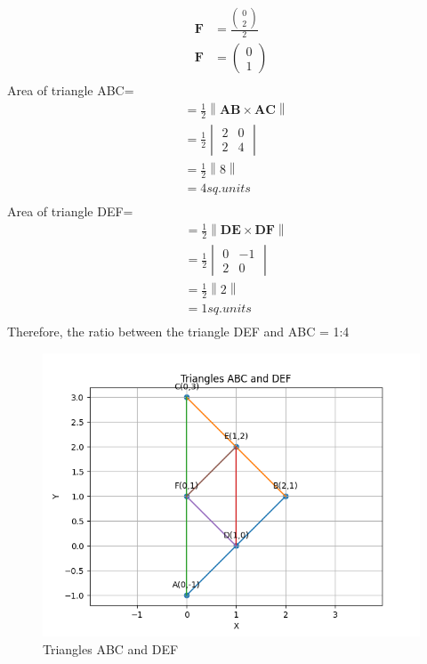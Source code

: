 \documentclass{article}
\newcommand{\myvec}[1]{\ensuremath{\begin{pmatrix}#1\end{pmatrix}}}
\newcommand{\mydet}[1]{\ensuremath{\begin{vmatrix}#1\end{vmatrix}}}
\providecommand{\norm}[1]{\left\lVert#1\right\rVert}
\let\vec\mathbf
\begin{document}
\begin{enumerate}
\begin{align}
    \vec{F} &= \frac{\myvec{0\\2}}{2}\\
    \vec{F} &= \myvec{0\\1}\\
\end{align}
Area of triangle ABC=
 \begin{align}
 &=\frac{1}{2}\norm{\vec{AB}\times\vec{AC}}\\
  &=\frac{1}{2}\mydet{2&0\\2&4}\\
   &=\frac{1}{2}\norm{8}\\
    &=4 sq.units\\
\end{align}
Area of triangle DEF= 
 \begin{align}
 &=\frac{1}{2}\norm{\vec{DE}\times\vec{DF}}\\
  &=\frac{1}{2}\mydet{0&-1\\2&0}\\
   &=\frac{1}{2}\norm{2}\\
    &=1 sq.units\\
 \end{align}
 Therefore, the ratio between the triangle DEF and ABC = 1:4
\end{enumerate}
\begin{figure}[H]
			\centering
			\includegraphics[width=\columnwidth]{figs/Figure_1.png}
			\caption{Triangles ABC and DEF}
			\label{fig:tri2}
		\end{figure}
\end{document}
